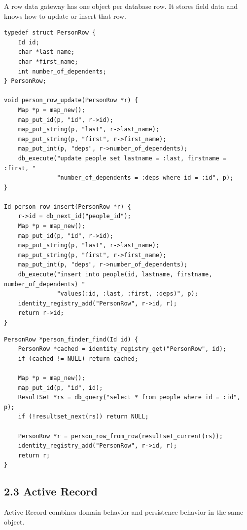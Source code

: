 \documentclass[11pt]{article}
\begin{document}
A row data gateway has one object per database row. It stores field data
and knows how to update or insert that row.

\begin{verbatim}
typedef struct PersonRow {
    Id id;
    char *last_name;
    char *first_name;
    int number_of_dependents;
} PersonRow;

void person_row_update(PersonRow *r) {
    Map *p = map_new();
    map_put_id(p, "id", r->id);
    map_put_string(p, "last", r->last_name);
    map_put_string(p, "first", r->first_name);
    map_put_int(p, "deps", r->number_of_dependents);
    db_execute("update people set lastname = :last, firstname = :first, "
               "number_of_dependents = :deps where id = :id", p);
}

Id person_row_insert(PersonRow *r) {
    r->id = db_next_id("people_id");
    Map *p = map_new();
    map_put_id(p, "id", r->id);
    map_put_string(p, "last", r->last_name);
    map_put_string(p, "first", r->first_name);
    map_put_int(p, "deps", r->number_of_dependents);
    db_execute("insert into people(id, lastname, firstname, number_of_dependents) "
               "values(:id, :last, :first, :deps)", p);
    identity_registry_add("PersonRow", r->id, r);
    return r->id;
}
\end{verbatim}

\begin{verbatim}
PersonRow *person_finder_find(Id id) {
    PersonRow *cached = identity_registry_get("PersonRow", id);
    if (cached != NULL) return cached;

    Map *p = map_new();
    map_put_id(p, "id", id);
    ResultSet *rs = db_query("select * from people where id = :id", p);
    if (!resultset_next(rs)) return NULL;

    PersonRow *r = person_row_from_row(resultset_current(rs));
    identity_registry_add("PersonRow", r->id, r);
    return r;
}
\end{verbatim}

\subsection{2.3 Active Record}\label{active-record}

Active Record combines domain behavior and persistence behavior in the
same object.
\end{document}
